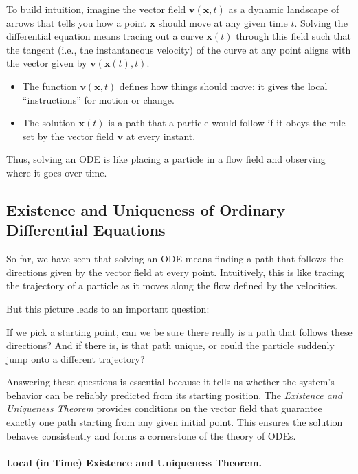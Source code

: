 To build intuition, imagine the vector field $\mathbf{v}(\mathbf{x}, t)$ as a dynamic landscape of arrows that tells you how a point $\mathbf{x}$ should move at any given time $t$. Solving the differential equation means tracing out a curve $\mathbf{x}(t)$ through this field such that the tangent (i.e., the instantaneous velocity) of the curve at any point aligns with the vector given by $\mathbf{v}(\mathbf{x}(t), t)$.
\begin{itemize}
    \item {} The function $\mathbf{v}(\mathbf{x}, t)$ defines how things should move: it gives the local ``instructions'' for motion or change.
    \item {} The solution $\mathbf{x}(t)$ is a path that a particle would follow if it obeys the rule set by the vector field $\mathbf{v}$ at every instant.
\end{itemize}
Thus, solving an ODE is like placing a particle in a flow field and observing where it goes over time.

\subsection{Existence and Uniqueness of Ordinary Differential Equations}
So far, we have seen that solving an ODE means finding a path that follows the directions given by the vector field at every point. Intuitively, this is like tracing the trajectory of a particle as it moves along the flow defined by the velocities.

But this picture leads to an important question: 
\begin{question}
    If we pick a starting point, can we be sure there really is a path that follows these directions? And if there is, is that path unique, or could the particle suddenly jump onto a different trajectory?
\end{question}

Answering these questions is essential because it tells us whether the system’s behavior can be reliably predicted from its starting position.  
The \emph{Existence and Uniqueness Theorem} provides conditions on the vector field that guarantee exactly one path starting from any given initial point.  
This ensures the solution behaves consistently and forms a cornerstone of the theory of ODEs.  


\paragraph{Local (in Time) Existence and Uniqueness Theorem.}


